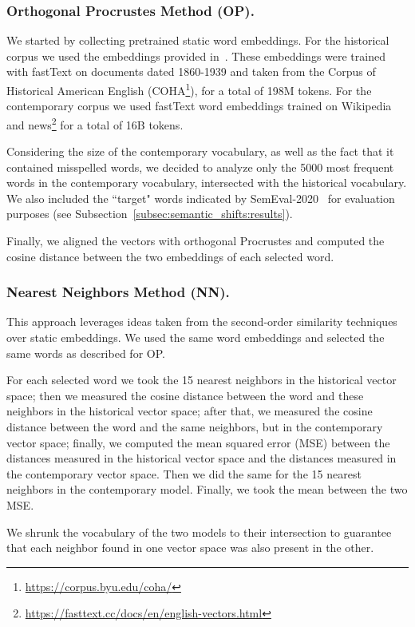 \documentclass[runningheads]{llncs}
\begin{document}
\subsubsection{Orthogonal Procrustes Method (OP).} We started by collecting pretrained static word embeddings. For the historical corpus we used the embeddings provided in~\cite{sprugnoli-tonelli-2019-histo}. These embeddings were trained with fastText on documents dated 1860-1939 and taken from the Corpus of Historical American English (COHA\footnote{\url{https://corpus.byu.edu/coha/}}), for a total of 198M tokens. For the contemporary corpus we used fastText word embeddings trained on Wikipedia and news\footnote{\url{https://fasttext.cc/docs/en/english-vectors.html}} for a total of 16B tokens.

Considering the size of the contemporary vocabulary, as well as the fact that it contained misspelled words, we decided to analyze only the 5000 most frequent words in the contemporary vocabulary, intersected with the historical vocabulary. We also included the “target" words indicated by SemEval-2020~\cite{schlechtweg-etal-2020-semeval} for evaluation purposes (see Subsection~\ref{subsec:semantic_shifts:results}).

Finally, we aligned the vectors with orthogonal Procrustes and computed the cosine distance between the two embeddings of each selected word.

\subsubsection{Nearest Neighbors Method (NN).} This approach leverages ideas taken from the second-order similarity techniques over static embeddings. We used the same word embeddings and selected the same words as described for OP.

For each selected word we took the 15 nearest neighbors in the historical vector space; then we measured the cosine distance between the word and these neighbors in the historical vector space; after that, we measured the cosine distance between the word and the same neighbors, but in the contemporary vector space; finally, we computed the mean squared error (MSE) between the distances measured in the historical vector space and the distances measured in the contemporary vector space. Then we did the same for the 15 nearest neighbors in the contemporary model. Finally, we took the mean between the two MSE. 

We shrunk the vocabulary of the two models to their intersection to guarantee that each neighbor found in one vector space was also present in the other. 
\end{document}
